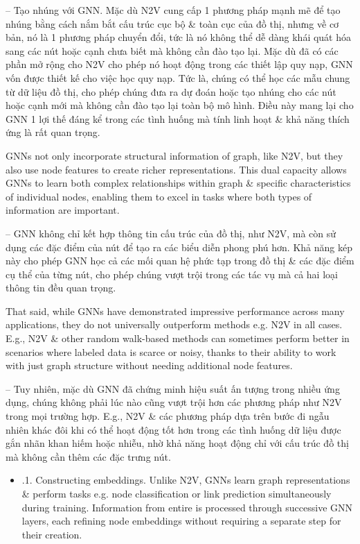 \documentclass{article}
\begin{document}
\begin{itemize}
\begin{itemize}
       -- {\sf Tạo nhúng với GNN.} Mặc dù N2V cung cấp 1 phương pháp mạnh mẽ để tạo nhúng bằng cách nắm bắt cấu trúc cục bộ \& toàn cục của đồ thị, nhưng về cơ bản, nó là 1 phương pháp chuyển đổi, tức là nó không thể dễ dàng khái quát hóa sang các nút hoặc cạnh chưa biết mà không cần đào tạo lại. Mặc dù đã có các phần mở rộng cho N2V cho phép nó hoạt động trong các thiết lập quy nạp, GNN vốn được thiết kế cho việc học quy nạp. Tức là, chúng có thể học các mẫu chung từ dữ liệu đồ thị, cho phép chúng đưa ra dự đoán hoặc tạo nhúng cho các nút hoặc cạnh mới mà không cần đào tạo lại toàn bộ mô hình. Điều này mang lại cho GNN 1 lợi thế đáng kể trong các tình huống mà tính linh hoạt \& khả năng thích ứng là rất quan trọng.

       GNNs not only incorporate structural information of graph, like N2V, but they also use node features to create richer representations. This dual capacity allows GNNs to learn both complex relationships within graph \& specific characteristics of individual nodes, enabling them to excel in tasks where both types of information are important.

       -- GNN không chỉ kết hợp thông tin cấu trúc của đồ thị, như N2V, mà còn sử dụng các đặc điểm của nút để tạo ra các biểu diễn phong phú hơn. Khả năng kép này cho phép GNN học cả các mối quan hệ phức tạp trong đồ thị \& các đặc điểm cụ thể của từng nút, cho phép chúng vượt trội trong các tác vụ mà cả hai loại thông tin đều quan trọng.

       That said, while GNNs have demonstrated impressive performance across many applications, they do not universally outperform methods e.g. N2V in all cases. E.g., N2V \& other random walk-based methods can sometimes perform better in scenarios where labeled data is scarce or noisy, thanks to their ability to work with just graph structure without needing additional node features.

       -- Tuy nhiên, mặc dù GNN đã chứng minh hiệu suất ấn tượng trong nhiều ứng dụng, chúng không phải lúc nào cũng vượt trội hơn các phương pháp như N2V trong mọi trường hợp. E.g., N2V \& các phương pháp dựa trên bước đi ngẫu nhiên khác đôi khi có thể hoạt động tốt hơn trong các tình huống dữ liệu được gắn nhãn khan hiếm hoặc nhiễu, nhờ khả năng hoạt động chỉ với cấu trúc đồ thị mà không cần thêm các đặc trưng nút.
       \begin{itemize}
           \item {.1. Constructing embeddings.} Unlike N2V, GNNs learn graph representations \& perform tasks e.g. node classification or link prediction simultaneously during training. Information from entire is processed through successive GNN layers, each refining node embeddings without requiring a separate step for their creation.


\end{itemize}
\end{itemize}
\end{itemize}
\end{document}
